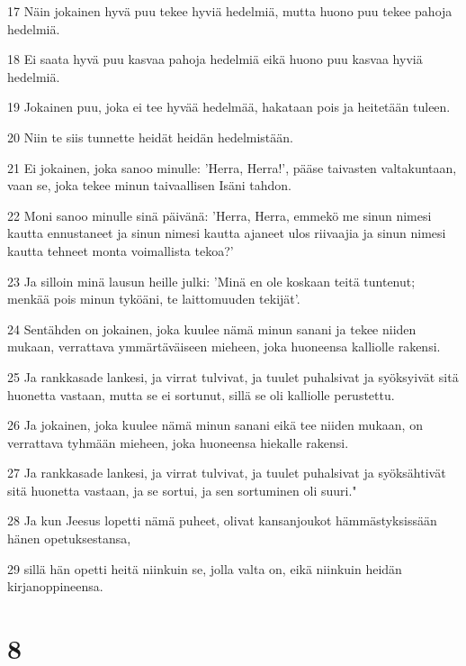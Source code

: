 \par 17 Näin jokainen hyvä puu tekee hyviä hedelmiä, mutta huono puu tekee pahoja hedelmiä.
\par 18 Ei saata hyvä puu kasvaa pahoja hedelmiä eikä huono puu kasvaa hyviä hedelmiä.
\par 19 Jokainen puu, joka ei tee hyvää hedelmää, hakataan pois ja heitetään tuleen.
\par 20 Niin te siis tunnette heidät heidän hedelmistään.
\par 21 Ei jokainen, joka sanoo minulle: 'Herra, Herra!', pääse taivasten valtakuntaan, vaan se, joka tekee minun taivaallisen Isäni tahdon.
\par 22 Moni sanoo minulle sinä päivänä: 'Herra, Herra, emmekö me sinun nimesi kautta ennustaneet ja sinun nimesi kautta ajaneet ulos riivaajia ja sinun nimesi kautta tehneet monta voimallista tekoa?'
\par 23 Ja silloin minä lausun heille julki: 'Minä en ole koskaan teitä tuntenut; menkää pois minun tyköäni, te laittomuuden tekijät'.
\par 24 Sentähden on jokainen, joka kuulee nämä minun sanani ja tekee niiden mukaan, verrattava ymmärtäväiseen mieheen, joka huoneensa kalliolle rakensi.
\par 25 Ja rankkasade lankesi, ja virrat tulvivat, ja tuulet puhalsivat ja syöksyivät sitä huonetta vastaan, mutta se ei sortunut, sillä se oli kalliolle perustettu.
\par 26 Ja jokainen, joka kuulee nämä minun sanani eikä tee niiden mukaan, on verrattava tyhmään mieheen, joka huoneensa hiekalle rakensi.
\par 27 Ja rankkasade lankesi, ja virrat tulvivat, ja tuulet puhalsivat ja syöksähtivät sitä huonetta vastaan, ja se sortui, ja sen sortuminen oli suuri."
\par 28 Ja kun Jeesus lopetti nämä puheet, olivat kansanjoukot hämmästyksissään hänen opetuksestansa,
\par 29 sillä hän opetti heitä niinkuin se, jolla valta on, eikä niinkuin heidän kirjanoppineensa.

\chapter{8}

